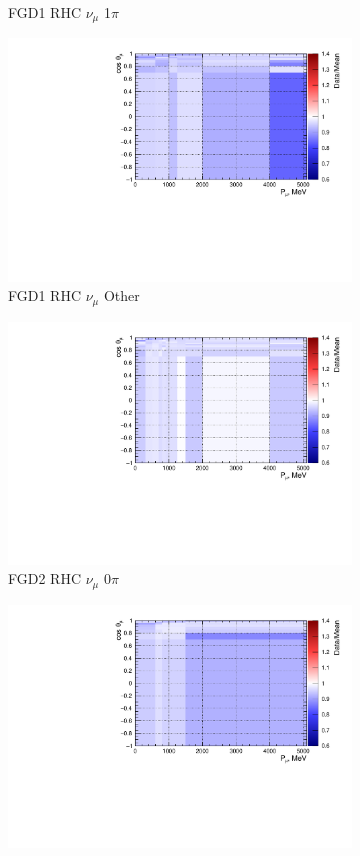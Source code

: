 \begin{figure}
\begin{subfigure}{.32\textwidth}
  \caption{FGD1 RHC $\nu_{\mu}$ 1$\pi$}
  \label{fig:priorpred_FGD1_NuMuBkg_CC1pi_in_AntiNu_Mode}
\end{subfigure}
\begin{subfigure}{.32\textwidth}
  \centering
  \includegraphics[width=0.85\linewidth]{figs/priorpred_FGD1_NuMuBkg_CCOther_in_AntiNu_Mode.pdf}
  \caption{FGD1 RHC $\nu_{\mu}$ Other}
  \label{fig:priorpred_FGD1_NuMuBkg_CCOther_in_AntiNu_Mode}
\end{subfigure}
\begin{subfigure}{.32\textwidth}
  \centering
  \includegraphics[width=0.85\linewidth]{figs/priorpred_FGD2_NuMuBkg_CC0pi_in_AntiNu_Mode.pdf}
  \caption{FGD2 RHC $\nu_{\mu}$ 0$\pi$}
  \label{fig:priorpred_FGD2_NuMuBkg_CC0pi_in_AntiNu_Mode}
\end{subfigure}
\begin{subfigure}{.32\textwidth}
  \centering
  \includegraphics[width=0.85\linewidth]{figs/priorpred_FGD2_NuMuBkg_CC1pi_in_AntiNu_Mode.pdf}

\end{subfigure}
\end{figure}
